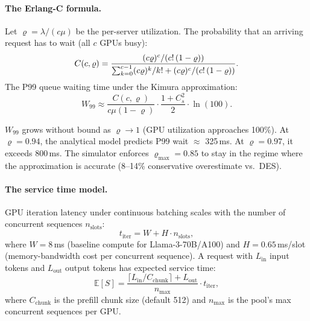 \documentclass[11pt,a4paper]{article}
\begin{document}
\paragraph{The Erlang-C formula.}
Let $\varrho = \lambda/(c\mu)$ be the per-server utilization.  The
probability that an arriving request has to wait (all $c$ GPUs busy):
\begin{equation}
  C(c, \varrho) = \frac{(c\varrho)^c / (c!\,(1-\varrho))}{%
    \sum_{k=0}^{c-1}(c\varrho)^k/k! + (c\varrho)^c/(c!\,(1-\varrho))}.
  \label{eq:erlang-c}
\end{equation}
The P99 queue waiting time under the Kimura approximation:
\begin{equation}
  W_{99} \approx \frac{C(c,\varrho)}{c\mu(1-\varrho)}
    \cdot \frac{1+C_s^2}{2} \cdot \ln(100).
  \label{eq:w99}
\end{equation}

\begin{keyinsight}
  $W_{99}$ grows without bound as $\varrho \to 1$ (GPU utilization
  approaches 100\%).  At $\varrho = 0.94$, the analytical model
  predicts P99 wait $\approx$ 325\,ms.  At $\varrho = 0.97$, it
  exceeds 800\,ms.  The simulator enforces $\varrho_{\max} = 0.85$
  to stay in the regime where the approximation is accurate
  (8--14\% conservative overestimate vs.\ DES).
\end{keyinsight}

\paragraph{The service time model.}
GPU iteration latency under continuous batching scales with the number
of concurrent sequences $n_{\text{slots}}$:
\begin{equation}
  t_{\text{iter}} = W + H \cdot n_{\text{slots}},
  \label{eq:iter}
\end{equation}
where $W = 8$\,ms (baseline compute for Llama-3-70B/A100) and
$H = 0.65$\,ms/slot (memory-bandwidth cost per concurrent sequence).
A request with $L_{\text{in}}$ input tokens and $L_{\text{out}}$
output tokens has expected service time:
\begin{equation}
  \mathbb{E}[S] = \frac{\lceil L_{\text{in}} / C_{\text{chunk}} \rceil
    + L_{\text{out}}}{n_{\max}} \cdot t_{\text{iter}},
  \label{eq:service-time}
\end{equation}
where $C_{\text{chunk}}$ is the prefill chunk size (default 512) and
$n_{\max}$ is the pool's max concurrent sequences per GPU.
\end{document}
